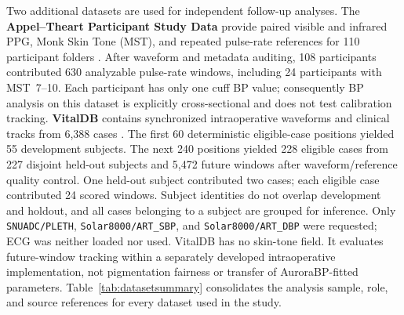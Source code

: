 \documentclass[journal]{IEEEtran}
\begin{document}
Two additional datasets are used for independent follow-up analyses. The \textbf{Appel--Theart Participant Study Data} provide paired visible and infrared PPG, Monk Skin Tone (MST), and repeated pulse-rate references for 110 participant folders \cite{appel2025ppg}. After waveform and metadata auditing, 108 participants contributed 630 analyzable pulse-rate windows, including 24 participants with MST~7--10. Each participant has only one cuff BP value; consequently BP analysis on this dataset is explicitly cross-sectional and does not test calibration tracking. \textbf{VitalDB} contains synchronized intraoperative waveforms and clinical tracks from 6{,}388 cases \cite{lee2022vitaldb,vitaldbDataset}. The first 60 deterministic eligible-case positions yielded 55 development subjects. The next 240 positions yielded 228 eligible cases from 227 disjoint held-out subjects and 5{,}472 future windows after waveform/reference quality control. One held-out subject contributed two cases; each eligible case contributed 24 scored windows. Subject identities do not overlap development and holdout, and all cases belonging to a subject are grouped for inference. Only \texttt{SNUADC/PLETH}, \texttt{Solar8000/ART\_SBP}, and \texttt{Solar8000/ART\_DBP} were requested; ECG was neither loaded nor used. VitalDB has no skin-tone field. It evaluates future-window tracking within a separately developed intraoperative implementation, not pigmentation fairness or transfer of AuroraBP-fitted parameters.
Table~\ref{tab:datasetsummary} consolidates the analysis sample, role, and source references for every dataset used in the study.
\end{document}
